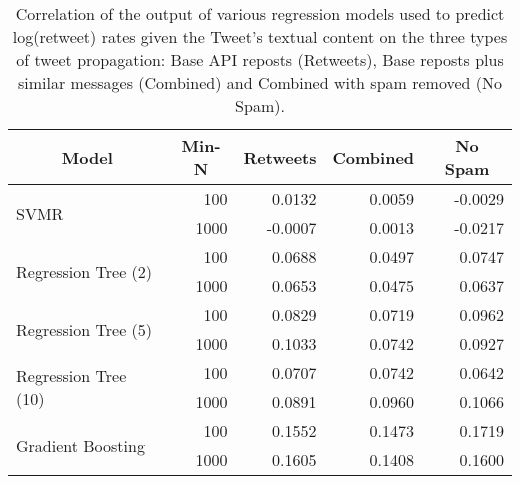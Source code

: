 \begin{table}[]
\centering
\begin{tabular}{|l|r|r|r|r|}
\hline
\multicolumn{1}{|c|}{Model}           & \multicolumn{1}{c|}{Min-N} & \multicolumn{1}{c|}{Retweets} & \multicolumn{1}{c|}{Combined} & \multicolumn{1}{c|}{No Spam} \\ \hline
\multirow{2}{*}{SVMR}                 & 100                        & 0.0132                        & 0.0059                        & -0.0029                      \\ \cline{2-5} 
                                      & 1000                       & -0.0007                       & 0.0013                        & -0.0217                      \\ \hline
\multirow{2}{*}{Regression Tree (2)}  & 100                        & 0.0688                        & 0.0497                        & 0.0747                       \\ \cline{2-5} 
                                      & 1000                       & 0.0653                        & 0.0475                        & 0.0637                       \\ \hline
\multirow{2}{*}{Regression Tree (5)}  & 100                        & 0.0829                        & 0.0719                        & 0.0962                       \\ \cline{2-5} 
                                      & 1000                       & 0.1033                        & 0.0742                        & 0.0927                       \\ \hline
\multirow{2}{*}{Regression Tree (10)} & 100                        & 0.0707                        & 0.0742                        & 0.0642                       \\ \cline{2-5} 
                                      & 1000                       & 0.0891                        & 0.0960                        & 0.1066                       \\ \hline
\multirow{2}{*}{Gradient Boosting}    & 100                        & 0.1552                        & 0.1473                        & 0.1719                       \\ \cline{2-5} 
                                      & 1000                       & 0.1605                        & 0.1408                        & 0.1600                       \\ \hline
\end{tabular}
\caption{Correlation of the output of various regression models used to predict log(retweet) rates given the Tweet's textual content on the three types of tweet propagation: Base API reposts (Retweets), Base reposts plus similar messages (Combined) and Combined with spam removed (No Spam).}
\label{tab:keywordregressionsupplemental}
\end{table}

